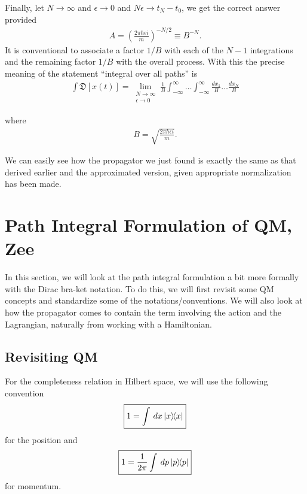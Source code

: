 \documentclass{book}
\theoremstyle{definition}
\newcommand{\f}[2]{\frac{#1}{#2}}
\newcommand{\lp}{\left(}
\newcommand{\rp}{\right)}
\begin{document}
Finally, let $N\to \infty$ and $\epsilon \to 0$ and $N\epsilon \to t_N - t_0$, we get the correct answer provided 
\begin{align}
A = \lp \f{2\pi\hbar \epsilon i}{m} \rp^{-N/2} \equiv B^{-N}.
\end{align}
It is conventional to associate a factor $1/B$ with each of the $N-1$ integrations and the remaining factor $1/B$ with the overall process. With this the precise meaning of the statement ``integral over all paths'' is 
\begin{align}
\boxed{\int \mathfrak{D}[x(t)] = \lim_{\substack{N\to\infty \\ \epsilon\to 0}} \f{1}{B} \int_{-\infty}^{\infty} \dots \int_{-\infty}^{\infty}  \f{dx_1}{B}\dots \f{dx_N}{B}}
\end{align}


where
\begin{align}
B = \sqrt{\f{2\pi\hbar \epsilon i}{m}}.
\end{align}


We can easily see how the propagator we just found is exactly the same as that derived earlier and the approximated version, given appropriate normalization has been made. 








\newpage







\section{Path Integral Formulation of QM, Zee}




In this section, we will look at the path integral formulation a bit more formally with the Dirac bra-ket notation. To do this, we will first revisit some QM concepts and standardize some of the notations/conventions. We will also look at how the propagator comes to contain the term involving the action and the Lagrangian, naturally from working with a Hamiltonian.


\subsection{Revisiting QM}


For the completeness relation in Hilbert space, we will use the following convention
\begin{align}
\boxed{1 = \int \,dx \ketbra{x}}
\end{align}
for the position and 
\begin{align}
\boxed{1 = \f{1}{2\pi}\int \,dp \ketbra{p}}
\end{align}
for momentum. \\
\end{document}
